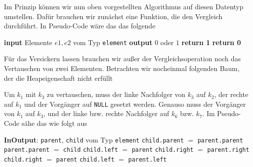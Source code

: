 \documentclass[tikz,12pt]{article}
\begin{document}
Im Prinzip können wir nun oben vorgestellten Algorithmus auf diesen Datentyp umstellen.
Dafür brauchen wir zunächst eine Funktion, die den Vergleich durchführt. 
In Pseudo-Code wäre das das folgende
\begin{algorithmic}[1]
  \State\textbf{input} Elemente $e1, e2$ vom Typ \texttt{element}
  \State \textbf{output} $0$ oder $1$
  \State \textbf{return 1}
  \Else
  \State \textbf{return 0}
  \EndIf
  \EndProcedure
\end{algorithmic}
Für das Versickern lassen brauchen wir außer der Vergleichsoperation noch das Vertauschen von zwei Elementen. 
Betrachten wir nocheinmal folgenden Baum, der die Heapeigenschaft nicht erfüllt
\begin{center}
\end{center}
Um $k_1$ mit $k_3$ zu vertauschen, muss der linke Nachfolger von $k_3$ auf $k_2$, der rechte auf $k_1$ und der Vorgänger auf \texttt{NULL} gesetzt werden.
Genauso muss der Vorgänger von $k_1$ auf $k_3$, und der linke bzw. rechte Nachfolger auf $k_6$ bzw. $k_7$. 
Im Pseudo-Code sähe das wie folgt aus
\begin{algorithmic}[1]
  \State\textbf{InOutput}: \texttt{parent}, \texttt{child} vom Typ \texttt{element}
  \State \texttt{child.parent} $=$ \texttt{parent.parent}
  \State \texttt{parent.parent} $=$ \texttt{child}
  \State \texttt{child.left} $=$ \texttt{parent}
  \State \texttt{child.right} $=$ \texttt{parent.right}
  \Else
  \State \texttt{child.right} $=$ \texttt{parent}
  \State \texttt{child.left} $=$ \texttt{parent.left}
  \EndIf
  \EndProcedure
\end{algorithmic}
\end{document}
